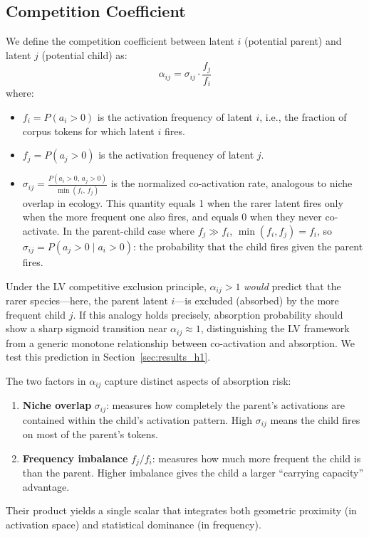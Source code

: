 \documentclass{article}
\begin{document}
\subsection{Competition Coefficient}
\label{sec:competition_coeff}

We define the competition coefficient between latent $i$ (potential parent) and latent $j$ (potential child) as:
\begin{equation}
  \alpha_{ij} = \sigma_{ij} \cdot \frac{f_j}{f_i}
  \label{eq:alpha}
\end{equation}
where:
\begin{itemize}
  \item $f_i = P(a_i > 0)$ is the activation frequency of latent $i$, i.e., the fraction of corpus tokens for which latent $i$ fires.
  \item $f_j = P(a_j > 0)$ is the activation frequency of latent $j$.
  \item $\sigma_{ij} = \frac{P(a_i > 0,\, a_j > 0)}{\min(f_i,\, f_j)}$ is the normalized co-activation rate, analogous to niche overlap in ecology. This quantity equals 1 when the rarer latent fires only when the more frequent one also fires, and equals 0 when they never co-activate. In the parent-child case where $f_j \gg f_i$, $\min(f_i, f_j) = f_i$, so $\sigma_{ij} = P(a_j > 0 \mid a_i > 0)$: the probability that the child fires given the parent fires.
\end{itemize}

Under the LV competitive exclusion principle, $\alpha_{ij} > 1$ \emph{would} predict that the rarer species---here, the parent latent $i$---is excluded (absorbed) by the more frequent child $j$. If this analogy holds precisely, absorption probability should show a sharp sigmoid transition near $\alpha_{ij} \approx 1$, distinguishing the LV framework from a generic monotone relationship between co-activation and absorption. We test this prediction in Section~\ref{sec:results_h1}.

The two factors in $\alpha_{ij}$ capture distinct aspects of absorption risk:
\begin{enumerate}
  \item \textbf{Niche overlap} $\sigma_{ij}$: measures how completely the parent's activations are contained within the child's activation pattern. High $\sigma_{ij}$ means the child fires on most of the parent's tokens.
  \item \textbf{Frequency imbalance} $f_j / f_i$: measures how much more frequent the child is than the parent. Higher imbalance gives the child a larger ``carrying capacity'' advantage.
\end{enumerate}
Their product yields a single scalar that integrates both geometric proximity (in activation space) and statistical dominance (in frequency).
\end{document}
